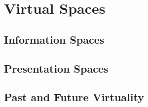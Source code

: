 \chapter{Virtual Spaces}




\section{Information Spaces}


\section{Presentation Spaces}


\section{Past and Future Virtuality}